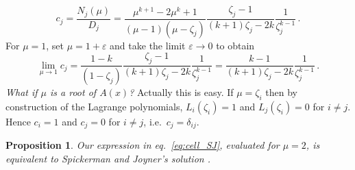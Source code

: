 \documentclass[review]{elsarticle}
\theoremstyle{plain}
\newtheorem{proposition}[theorem]{Proposition}
\begin{document}
\begin{equation}
\label{eq:cell_SJ}  
c_j = \frac{N_j(\mu)}{D_j} = \frac{\mu^{k+1}-2\mu^k+1}{(\mu-1)(\mu-\zeta_j)} \frac{\zeta_j-1}{(k+1)\zeta_j-2k}\frac{1}{\zeta_j^{k-1}} \,.
\end{equation}
For $\mu=1$, set $\mu=1+\varepsilon$ and take the limit $\varepsilon\to0$ to obtain 
\begin{equation}
\lim_{\mu\to1} c_j = \frac{1-k}{(1-\zeta_j)} \frac{\zeta_j-1}{(k+1)\zeta_j-2k}\frac{1}{\zeta_j^{k-1}}
= \frac{k-1}{(k+1)\zeta_j-2k}\frac{1}{\zeta_j^{k-1}} \,.
\end{equation}
\emph{What if $\mu$ is a root of $A(x)$?}
Actually this is easy.
If $\mu=\zeta_i$ then by construction of the Lagrange polynomials,
$L_i(\zeta_i)=1$ and $L_j(\zeta_i)=0$ for $i\ne j$.
Hence $c_i=1$ and $c_j=0$ for $i\ne j$, i.e.~$c_j = \delta_{ij}$.
\begin{proposition}  
Our expression in eq.~\eqref{eq:cell_SJ}, evaluated for $\mu=2$, is equivalent to Spickerman and Joyner's solution \cite{SpickermanJoyner}.
\end{proposition}  
\end{document}

